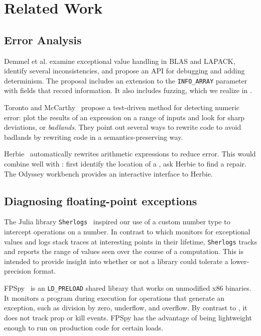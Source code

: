 \documentclass{juliacon}
\begin{document}
\section{Related Work}
\label{s:related}

\subsection{Error Analysis}

Demmel et al.\cite{ddghlllprr-correctness-2022} examine \fp{} exceptional value handling in BLAS and LAPACK, identify several inconsistencies, and propose an API for debugging and adding determinism.
The proposal includes an extension to the \texttt{INFO\_ARRAY} parameter with fields that record \genpropkill{} information.
It also includes fuzzing, which we realize in \FT{}.

Toronto and McCarthy~\cite{torontoPracticallyAccurateFloatingPoint2014} propose a test-driven method for detecting numeric error: plot the results of an expression on a range of inputs and look for sharp deviations, or \emph{badlands}.
They point out several ways to rewrite code to avoid badlands by rewriting code in a semantics-preserving way.

Herbie~\cite{panchekhaAutomaticallyImprovingAccuracy2015} automatically rewrites arithmetic expressions to reduce \fp{} error.
This would combine well with \FT{}: first identify the location of a \NaN{}, ask Herbie to find a repair.
The Odyssey\cite{misbackOdysseyInteractiveWorkbench2023} workbench provides an interactive interface to Herbie.


\subsection{Diagnosing floating-point exceptions}

The Julia library \texttt{Sherlogs}~\cite{kMilanklSherlogsJl2021} inspired our use of a custom number type to intercept operations on a number.
In contrast to \FT{} which monitors for exceptional values and logs stack traces at interesting points in their lifetime, \texttt{Sherlogs} tracks and reports the range of values seen over the course of a computation.
This is intended to provide insight into whether or not a library could tolerate a lower-precision \fp{} format.

FPSpy~\cite{dindaSpyingFloatingPoint2020} is an \texttt{LD\_PRELOAD} shared library that works on unmodified x86 binaries.
It monitors a program during execution for operations that generate an exception, such as division by zero, underflow, and overflow.
By contrast to \FT{}, it does not track prop or kill events.
FPSpy has the advantage of being lightweight enough to run on production code for certain loads.
\end{document}
